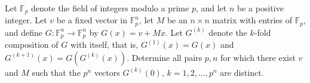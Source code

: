 Let $\mathbb{F}_p$ denote the field of integers modulo a prime $p$, and let $n$ be a positive integer. Let $v$ be a fixed vector in $\mathbb{F}_p^n$, let $M$ be an $n\times n$ matrix with entries of $\mathbb{F}_p$, and define $G:\mathbb{F}_p^n\to\mathbb{F}_p^n$ by $G(x)=v+Mx$. Let $G^{(k)}$ denote the $k$-fold composition of $G$ with itself, that is, $G^{(1)}(x)=G(x)$ and $G^{(k+1)}(x)=G(G^{(k)}(x))$. Determine all pairs $p,n$ for which there exist $v$ and $M$ such that the $p^n$ vectors $G^{(k)}(0)$, $k=1,2,\ldots,p^n$ are distinct.